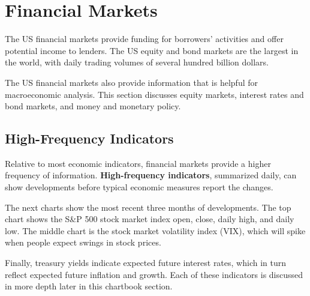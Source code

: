 \section*{Financial Markets}

\thispagestyle{sectpage}
\begin{minipage}{0.76\textwidth}
\vspace{-0.5mm}
\small The US financial markets provide funding for borrowers' activities and offer potential income to lenders. The US equity and bond markets are the largest in the world, with daily trading volumes of several hundred billion dollars. 

The US financial markets also provide information that is helpful for macroeconomic analysis. This section discusses equity markets, interest rates and bond markets, and money and monetary policy. 
\end{minipage}
\vspace{0.5mm}
\subsection*{High-Frequency Indicators}

\begin{minipage}{0.76\textwidth}
\small Relative to most economic indicators, financial markets provide a higher frequency of information. \textbf{High-frequency indicators}, summarized daily, can show developments before typical economic measures report the changes. 

The next charts show the most recent three months of developments. The top chart shows the S\&P 500 stock market index open, close, daily high, and daily low. The middle chart is the stock market volatility index (VIX), which will spike when people expect swings in stock prices. 

Finally, treasury yields indicate expected future interest rates, which in turn reflect expected future inflation and growth. Each of these indicators is discussed in more depth later in this chartbook section. 
\end{minipage}
\vspace{0.5mm}

